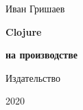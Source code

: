 
\begin{titlepage}

\begin{center}

  {Иван Гришаев}

  \vspace*{5cm}

  {\Huge\textbf{Clojure}}

  \vspace{1mm}

  {\Large\textbf{на производстве}}

  \vspace*{\fill}

  \ifx\publisher\dummy
  \else
  {Издательство \publisher}
  \fi

  {2020}

\end{center}

\end{titlepage}
